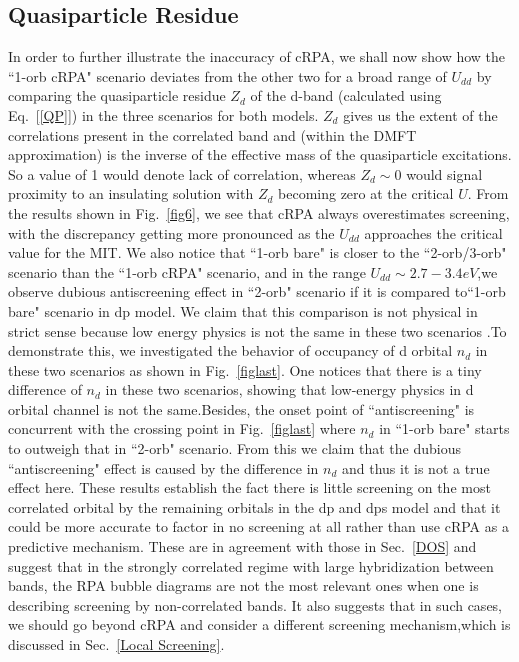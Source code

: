 \documentclass[10pt]{ruthesis}
\begin{document}
{\subsection{Quasiparticle Residue}
In order to further illustrate the inaccuracy of cRPA, we shall now show how the ``1-orb cRPA" scenario deviates from the other two for a broad range of $U_{dd}$ by comparing the quasiparticle residue $Z_d$ of the d-band (calculated using Eq.~[\ref{QP}]) in the three scenarios for both models. $Z_d$ gives us the extent of the correlations present in the correlated band and (within the DMFT approximation) is the inverse of the effective mass of the quasiparticle excitations. So a value of 1 would denote lack of correlation, whereas $Z_d \sim 0$ would signal proximity to an insulating solution with $Z_d$ becoming zero at the critical $U$. From the results shown in Fig.~\ref{fig6}, we see that cRPA always overestimates screening, with the discrepancy getting more pronounced as the $U_{dd}$ approaches the critical value for the MIT. We also notice that ``1-orb bare" is closer to the ``2-orb/3-orb" scenario than the ``1-orb cRPA" scenario, and in the range $U_{dd}\sim 2.7-3.4eV$,we observe dubious antiscreening effect in ``2-orb" scenario if it is compared to``1-orb bare" scenario in dp model. We claim that this comparison is not physical in strict sense because low energy physics is not the same in these two scenarios .To demonstrate this, we investigated the behavior of occupancy of d orbital $n_d$ in these two scenarios as shown in Fig.~\ref{figlast}. One notices that there is a tiny difference of $n_d$ in these two scenarios, showing that low-energy physics in d orbital channel is not the same.Besides, the onset point of ``antiscreening" is concurrent with the  crossing point in Fig.~\ref{figlast} where $n_d$ in ``1-orb bare" starts to outweigh that in ``2-orb" scenario. From this we claim that the dubious ``antiscreening" effect is caused by the difference in $n_d$ and thus it is not a true effect here. These results establish the fact there is little screening on the most correlated orbital by the remaining orbitals in the dp and dps model and that it could be more accurate to factor in no screening at all rather than use cRPA as a predictive mechanism.  These are in agreement with those in Sec.~\ref{DOS} and suggest that in the strongly correlated regime with large hybridization between bands, the RPA bubble diagrams are not  the most relevant ones when one is describing screening by non-correlated bands. It also suggests that in such cases, we should go beyond cRPA and consider a different screening mechanism,which is discussed in Sec.~\ref{Local Screening}.

}
\end{document}

